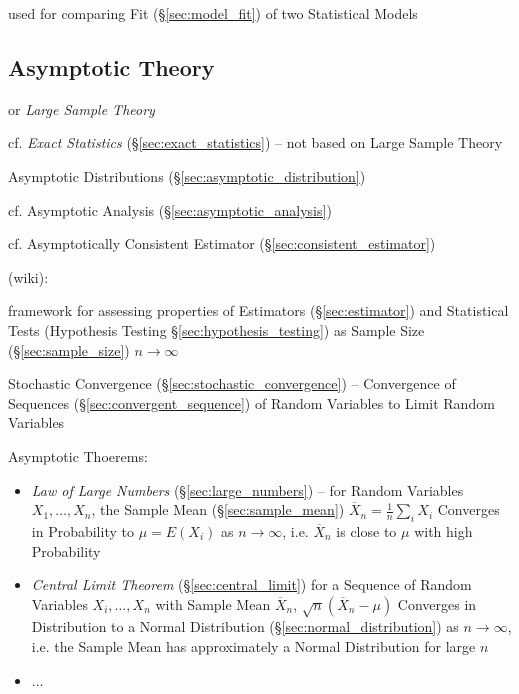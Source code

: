 used for comparing Fit (\S\ref{sec:model_fit}) of two Statistical Models



\subsection{Asymptotic Theory}\label{sec:asymptotic_theory}

or \emph{Large Sample Theory}

\fist cf. \emph{Exact Statistics} (\S\ref{sec:exact_statistics}) -- not based on
Large Sample Theory

\fist Asymptotic Distributions (\S\ref{sec:asymptotic_distribution})

\fist cf. Asymptotic Analysis (\S\ref{sec:asymptotic_analysis})

\fist cf. Asymptotically Consistent Estimator (\S\ref{sec:consistent_estimator})

(wiki):

framework for assessing properties of Estimators (\S\ref{sec:estimator}) and
Statistical Tests (Hypothesis Testing \S\ref{sec:hypothesis_testing}) as Sample
Size (\S\ref{sec:sample_size}) $n \to \infty$

\fist Stochastic Convergence (\S\ref{sec:stochastic_convergence}) -- Convergence
of Sequences (\S\ref{sec:convergent_sequence}) of Random Variables to Limit
Random Variables

Asymptotic Thoerems:
\begin{itemize}
  \item \emph{Law of Large Numbers} (\S\ref{sec:large_numbers}) --
    for Random Variables $X_1, \ldots, X_n$, the Sample Mean
    (\S\ref{sec:sample_mean}) $\overline{X}_n = \frac{1}{n}\sum_i X_i$ Converges
    in Probability to $\mu = E(X_i)$ as $n \to \infty$, i.e.
    $\overline{X}_n$ is close to $\mu$ with high Probability
  \item \emph{Central Limit Theorem} (\S\ref{sec:central_limit})
    for a Sequence of Random Variables $X_i, \ldots, X_n$ with Sample Mean
    $\overline{X}_n$, $\sqrt{n}(\overline{X}_n - \mu)$
    Converges in Distribution to a Normal Distribution
    (\S\ref{sec:normal_distribution}) as $n \to \infty$, i.e. the Sample
    Mean has approximately a Normal Distribution for large $n$
  \item ...
\end{itemize}



